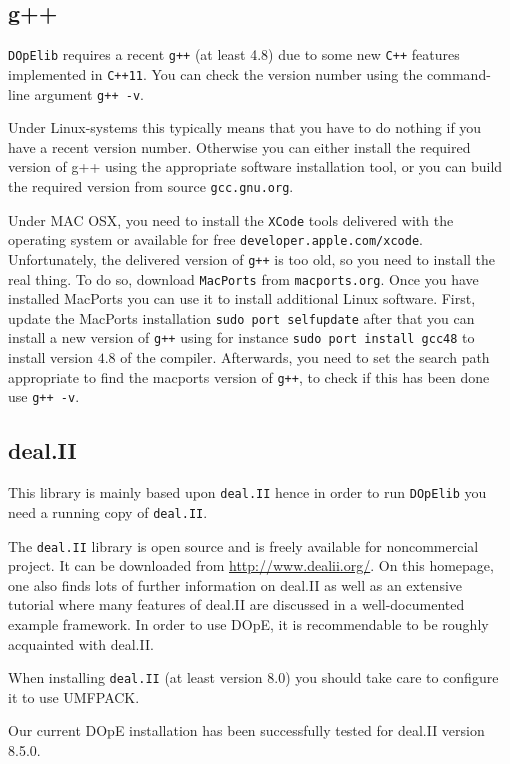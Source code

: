 \subsection{g++}
\texttt{DOpElib} requires a recent \texttt{g++} (at least 4.8) due to 
some new \texttt{C++} features implemented in \texttt{C++11}. 
You can check the version number using the command-line argument \texttt{g++ -v}.

Under Linux-systems this typically means that you have to do nothing if you have a recent 
version number. Otherwise you can either install the required version of g++ using the 
appropriate software installation tool, or you can build the required version from 
source \texttt{gcc.gnu.org}.

Under MAC OSX, you need to install the \texttt{XCode} tools delivered with the operating system 
or available for free \texttt{developer.apple.com/xcode}. Unfortunately, the delivered 
version of \texttt{g++} is too old, so you need to install the real thing. To do so, 
download \texttt{MacPorts} from \texttt{macports.org}. Once you have installed MacPorts 
you can use it to install additional Linux software. 
First, update the MacPorts installation \texttt{sudo port selfupdate}
after that you can install a new version of \texttt{g++} using for instance 
\texttt{sudo port install gcc48} to install version $4.8$ of the compiler.
Afterwards, you need to set the search path appropriate to find the macports version
of \texttt{g++}, to check if this has been done use \texttt{g++ -v}.

\subsection{deal.II}
This library is mainly based upon \texttt{deal.II} hence in order to run 
\texttt{DOpElib} you need a running copy of \texttt{deal.II}.

The \texttt{deal.II} library is open source and is freely available for noncommercial project.
It can be downloaded from \url{http://www.dealii.org/}. On this
homepage, one also finds lots of further information on deal.II as well as
an extensive tutorial where many features of deal.II are discussed in a
well-documented example framework. In order to use DOpE, it is
recommendable to be roughly acquainted with deal.II.

When installing \texttt{deal.II} (at least version 8.0) you should take care to configure 
it to use UMFPACK.

\begin{remark}
Our current DOpE installation has been successfully tested for deal.II version 8.5.0.
\end{remark}

